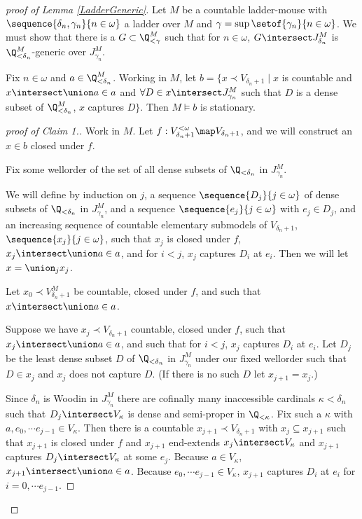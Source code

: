 \documentclass[oneside,12pt]{amsart}
\begin{document}
\begin{proof}[proof of Lemma  \ref{LadderGeneric}]
Let $M$ be a countable ladder-mouse
with $\sequence{\delta_n,\gamma_n}{n\in\omega}$ a ladder over $M$ and
$\gamma=\sup\setof{\gamma_n}{n\in\omega}$.
We must show that
there is a $G\subset \Q_{<\gamma}^M$ such that for $n\in\omega$,
$G\intersect J^M_{\delta_n}$ is $\Q_{<\delta_n}^M$-generic over $J^M_{\gamma_n}$.

\begin{claim}[Claim 1]
Fix $n\in\omega$ and $a\in \Q_{<\delta_n}^M$.
Working in $M$, let $b=\{x \prec V_{\delta_n+1} \mid x $ is countable and
$x\intersect\union a \in a$ and $\forall D\in x\intersect J^M_{\gamma_n}$ such that $D$ is a dense subset of $\Q_{<\delta_n}^M$, $x$ captures $D \}$.
Then $M\models b$ is stationary.
\end{claim}
\begin{proof}[proof of Claim 1.]
Work in $M$. Let $f:V_{\delta_n+1}^{<\omega}\map V_{\delta_n+1}$, and we will
construct an $x\in b$ closed under $f$.

Fix some wellorder of the set of all dense subsets of
$\Q_{<\delta_n}$ in $J^M_{\gamma_n}$.

We will define by induction on $j$, a sequence $\sequence{D_j}{j\in\omega}$
of dense subsets of
$\Q_{<\delta_n}$ in $J^M_{\gamma_n}$, and a sequence
$\sequence{e_j}{j\in\omega}$ with $e_j\in D_j$, and
an increasing sequence
of countable elementary submodels of $V_{\delta_n+1}$,
$\sequence{x_j}{j\in\omega}$, such that $x_j$ is closed under $f$,
$x_j\intersect \union a \in a$, and for $i<j$, $x_j$ captures
$D_i$ at $e_i$. Then we will let $x=\union_j x_j$.

Let $x_0 \prec V^M_{\delta_n+1}$ be countable, closed under $f$, and such that $x\intersect \union a \in a$.

Suppose we have $x_j\prec V_{\delta_n+1}$ countable, closed under $f$, such that
$x_j\intersect \union a \in a$, and such that for $i<j$, $x_j$ captures
$D_i$ at $e_i$.
Let $D_j$ be the least
dense subset $D$ of
$\Q_{<\delta_n}$ in $J^M_{\gamma_n}$ under our fixed wellorder such that $D\in x_j$ and $x_j$ does
not capture $D$. (If there is no such $D$ let $x_{j+1}=x_j$.)

Since $\delta_n$
is Woodin in $J^M_{\gamma_n}$ there are cofinally many inaccessible cardinals
$\kappa<\delta_n$ such
that $D_j\intersect V_{\kappa}$ is dense and semi-proper in $\Q_{<\kappa}$.
Fix such a $\kappa$ with
$a, e_0,\cdots e_{j-1}\in V_{\kappa}$. Then there is a countable
$x_{j+1} \prec V_{\delta_n+1}$
with $x_j\subseteq x_{j+1}$ such that $x_{j+1}$ is closed under $f$ and
$x_{j+1}$ end-extends $x_j\intersect V_{\kappa}$ and $x_{j+1}$ captures $D_j\intersect V_{\kappa}$ at some $e_j$.
Because $a\in V_{\kappa}$, $x_{j+1}\intersect \union a \in a$. Because
$e_0,\cdots e_{j-1} \in V_{\kappa}$, $x_{j+1}$ captures $D_i$ at $e_i$ for
$i=0,\cdots e_{j-1}$.


\end{proof}
\end{proof}
\end{document}
